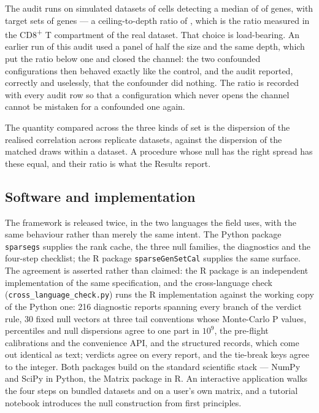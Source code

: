 \documentclass[11pt]{article}
\newcommand{\code}[1]{\texttt{#1}}
\begin{document}
The audit runs on simulated datasets of \auditCells{} cells detecting a median
of \auditDetected{} of \auditGenes{} genes, with target sets of \auditTarget{}
genes --- a ceiling-to-depth ratio of \auditDepthRatio{}, which is the ratio
measured in the CD8\textsuperscript{+} T compartment of the real dataset. That choice is load-bearing. An earlier run of this audit used a
panel of half the size and the same depth, which put the ratio below one and
closed the channel: the two confounded configurations then behaved exactly like
the control, and the audit reported, correctly and uselessly, that the
confounder did nothing. The ratio is recorded with every audit row so that a
configuration which never opens the channel cannot be mistaken for a confounded
one again.

The quantity compared across the three kinds of set is the dispersion of the
realised correlation across replicate datasets, against the dispersion of the
matched draws within a dataset. A procedure whose null has the right spread has
these equal, and their ratio is what the Results report.

\subsection{Software and implementation}
The framework is released twice, in the two languages the field uses, with the
same behaviour rather than merely the same intent. The Python package
\code{sparsegs} supplies the rank cache, the three null families, the
diagnostics and the four-step checklist; the R package \code{sparseGenSetCal}
supplies the same surface. The agreement is asserted rather than claimed: the
R package is an independent implementation of the same specification, and the
cross-language check (\code{cross\_language\_check.py}) runs the R
implementation against the working copy of the Python one: 216 diagnostic
reports spanning every branch of the verdict rule, 30 fixed null vectors at
three tail conventions whose Monte-Carlo P values, percentiles and null
dispersions agree to one part in $10^{9}$, the pre-flight calibrations and
the convenience API, and the structured records, which come out identical as
text; verdicts agree on every report, and the tie-break keys agree to the
integer. Both packages build on the standard scientific stack ---
NumPy \citep{harris2020} and SciPy \citep{virtanen2020} in Python, the Matrix
package in R. An interactive application walks the four steps
on bundled datasets and on a user's own matrix, and a tutorial notebook
introduces the null construction from first principles.
\end{document}
